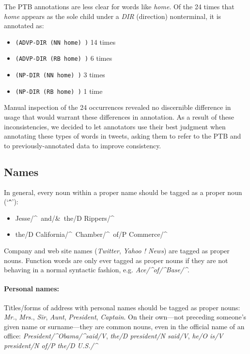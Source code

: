 \documentclass[11pt,letterpaper]{article}
\begin{document}
The PTB annotations are less clear for words like \emph{home}. Of the 24 times that \emph{home} appears as the sole child under a \emph{DIR} (direction) nonterminal, it is annotated as:
\begin{itemize}
\item \texttt{(ADVP-DIR (NN home) )} 14 times
\item \texttt{(ADVP-DIR (RB home) )} 6 times
\item \texttt{(NP-DIR (NN home) )} 3 times
\item \texttt{(NP-DIR (RB home) )} 1 time
\end{itemize}

Manual inspection of the 24 occurrences revealed no discernible difference in usage that would 
warrant these differences in annotation. As a result of these inconsistencies, we decided to let 
annotators use their best judgment when annotating these types of words in tweets, 
asking them to refer to the PTB and to previously-annotated data to improve consistency. 

\subsection{Names}

In general, every noun within a proper name should be tagged as a proper noun (`\verb|^|'):
\begin{itemize}
\item Jesse/\textasciicircum\ and/\&\ the/D Rippers/\textasciicircum
\item the/D California/\textasciicircum\ Chamber/\textasciicircum\ of/P Commerce/\textasciicircum
\end{itemize}
Company and web site names (\emph{Twitter}, \emph{Yahoo ! News}) are tagged as proper nouns.
Function words are only ever tagged as proper nouns
if they are not behaving in a normal syntactic fashion, e.g. \emph{Ace/\textasciicircum of/\textasciicircum Base/\textasciicircum}.

\paragraph{Personal names:} Titles/forms of address with personal names should be tagged as proper nouns: 
\emph{Mr.}, \emph{Mrs.}, \emph{Sir}, \emph{Aunt}, \emph{President}, \emph{Captain}. On their own\----not preceding someone's given name or surname\----they are common nouns, even in the official name of an office: \emph{President/\textasciicircum Obama/\textasciicircum said/V}, \emph{the/D president/N said/V}, \emph{he/O is/V president/N of/P the/D U.S./\textasciicircum}
\end{document}
